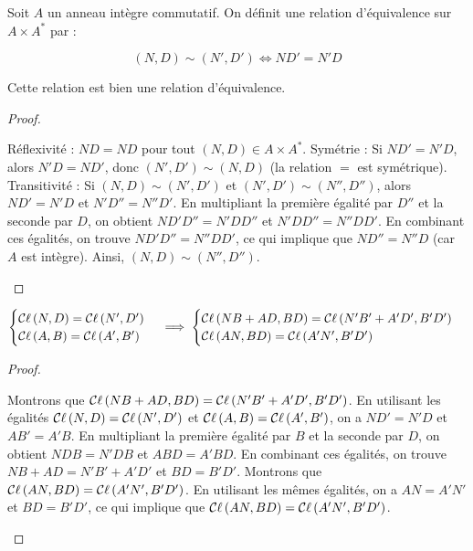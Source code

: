 \documentclass[12pt,a4paper]{report}
\begin{document}
\begin{property}
    Soit $A$ un anneau intègre commutatif. On définit une relation d'équivalence sur $A \times A^*$ par :

    $$(N, D) \sim (N', D') \iff ND' = N'D$$

    Cette relation est bien une relation d'équivalence.
\end{property}

\begin{proof}
    \begin{outline}
        \1 Réflexivité : $ND = ND$ pour tout $(N, D) \in A \times A^*$.
        \1 Symétrie : Si $ND' = N'D$, alors $N'D = ND'$, donc $(N', D') \sim (N, D)$ (la relation $=$ est symétrique).
        \1 Transitivité :
        \2 Si $(N, D) \sim (N', D')$ et $(N', D') \sim (N'', D'')$, alors $ND' = N'D$ et $N'D'' = N''D'$.
        \2 En multipliant la première égalité par $D''$ et la seconde par $D$, on obtient $ND'D'' = N'DD''$ et $N'DD'' = N''DD'$.
        \2 En combinant ces égalités, on trouve $ND'D'' = N''DD'$, ce qui implique que $ND'' = N''D$ (car $A$ est intègre).
        \2 Ainsi, $(N, D) \sim (N'', D'')$.
    \end{outline}
\end{proof}

\begin{property}
    $$\begin{cases}
    \mathcal{C}\ell\left(N,D\right) = \mathcal{C}\ell\left(N', D'\right)\\
    \mathcal{C}\ell\left(A,B\right) = \mathcal{C}\ell\left(A', B'\right)
    \end{cases}
    \implies
    \begin{cases}
    \mathcal{C}\ell\left(NB + AD, BD\right) = \mathcal{C}\ell\left(N'B' + A'D', B'D'\right)\\
    \mathcal{C}\ell\left(AN,BD\right) = \mathcal{C}\ell\left(A'N', B'D'\right)
    \end{cases}$$
\end{property}

\begin{proof}
    \begin{outline}
        \1 Montrons que $\mathcal{C}\ell\left(NB + AD, BD\right) = \mathcal{C}\ell\left(N'B' + A'D', B'D'\right)$.
        \2 En utilisant les égalités $\mathcal{C}\ell\left(N,D\right) = \mathcal{C}\ell\left(N', D'\right)$ et $\mathcal{C}\ell\left(A,B\right) = \mathcal{C}\ell\left(A', B'\right)$, on a $ND' = N'D$ et $AB' = A'B$.
        \2 En multipliant la première égalité par $B$ et la seconde par $D$, on obtient $NDB = N'DB$ et $ABD = A'BD$.
        \2 En combinant ces égalités, on trouve $NB + AD = N'B' + A'D'$ et $BD = B'D'$.
        \1 Montrons que $\mathcal{C}\ell\left(AN,BD\right) = \mathcal{C}\ell\left(A'N', B'D'\right)$.
        \1 En utilisant les mêmes égalités, on a $AN = A'N'$ et $BD = B'D'$, ce qui implique que $\mathcal{C}\ell\left(AN,BD\right) = \mathcal{C}\ell\left(A'N', B'D'\right)$.
    \end{outline}
\end{proof}
\end{document}
